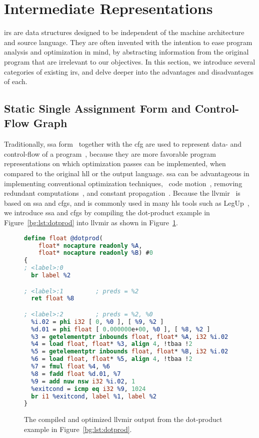 \section{Intermediate Representations}
\label{bg:sec:intermediate}

\Glspl{ir} are data structures designed to be independent of the machine
architecture and source language.  They are often invented with the intention
to ease program analysis and optimization in mind, by abstracting information
from the original program that are irrelevant to our objectives.  In this
section, we introduce several categories of existing \glspl{ir}, and delve
deeper into the advantages and disadvantages of each.

\subsection{Static Single Assignment Form and Control-Flow Graph}
\label{bg:sub:ssa_cfg}

Traditionally, \acrlong{ssa} form~\cite{alpern88, rau92} together
with the \acrlong{cfg} are used to represent data- and control-flow
of a program~\cite{cytron91}, because they are more favorable program
representations on which optimization passes can be implemented, when
compared to the original \gls{hll} or the output language.  \Gls{ssa} can be
advantageous in implementing conventional optimization techniques, \eg~code
motion~\cite{cytron86}, removing redundant computations~\cite{rosen88}, and
constant propagation~\cite{cytron91}.  Because the \gls{llvmir}~\cite{llvm_ir}
is based on \gls{ssa} and \glspl{cfg}, and is commonly used in many \gls{hls}
tools such as LegUp~\cite{legup}, we introduce \gls{ssa} and \glspl{cfg}
by compiling the dot-product example in Figure~\ref{bg:lst:dotprod} into
\gls{llvmir} as shown in Figure~\ref{bg:lst:dotprod_ll}.
\begin{figure}[ht]
    \centering
    \begin{lstlisting}[language=LLVM]
define float @dotprod(
    float* nocapture readonly %A,
    float* nocapture readonly %B) #0
{
; <label>:0
  br label %2

; <label>:1         ; preds = %2
  ret float %8

; <label>:2         ; preds = %2, %0
  %i.02 = phi i32 [ 0, %0 ], [ %9, %2 ]
  %d.01 = phi float [ 0.000000e+00, %0 ], [ %8, %2 ]
  %3 = getelementptr inbounds float, float* %A, i32 %i.02
  %4 = load float, float* %3, align 4, !tbaa !2
  %5 = getelementptr inbounds float, float* %B, i32 %i.02
  %6 = load float, float* %5, align 4, !tbaa !2
  %7 = fmul float %4, %6
  %8 = fadd float %d.01, %7
  %9 = add nuw nsw i32 %i.02, 1
  %exitcond = icmp eq i32 %9, 1024
  br i1 %exitcond, label %1, label %2
}
    \end{lstlisting}
    \caption{%
        The compiled and optimized \acrshort{llvmir} output from the
        dot-product example in Figure~\ref{bg:lst:dotprod}.
    }\label{bg:lst:dotprod_ll}
\end{figure}

